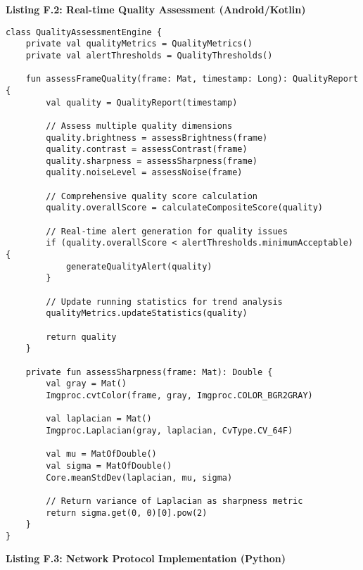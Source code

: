 \documentclass[11pt,a4paper]{article}
\begin{document}
\textbf{Listing F.2: Real-time Quality Assessment (Android/Kotlin)}

\begin{verbatim}
class QualityAssessmentEngine {
    private val qualityMetrics = QualityMetrics()
    private val alertThresholds = QualityThresholds()

    fun assessFrameQuality(frame: Mat, timestamp: Long): QualityReport {
        val quality = QualityReport(timestamp)

        // Assess multiple quality dimensions
        quality.brightness = assessBrightness(frame)
        quality.contrast = assessContrast(frame)
        quality.sharpness = assessSharpness(frame)
        quality.noiseLevel = assessNoise(frame)

        // Comprehensive quality score calculation
        quality.overallScore = calculateCompositeScore(quality)

        // Real-time alert generation for quality issues
        if (quality.overallScore < alertThresholds.minimumAcceptable) {
            generateQualityAlert(quality)
        }

        // Update running statistics for trend analysis
        qualityMetrics.updateStatistics(quality)

        return quality
    }

    private fun assessSharpness(frame: Mat): Double {
        val gray = Mat()
        Imgproc.cvtColor(frame, gray, Imgproc.COLOR_BGR2GRAY)

        val laplacian = Mat()
        Imgproc.Laplacian(gray, laplacian, CvType.CV_64F)

        val mu = MatOfDouble()
        val sigma = MatOfDouble()
        Core.meanStdDev(laplacian, mu, sigma)

        // Return variance of Laplacian as sharpness metric
        return sigma.get(0, 0)[0].pow(2)
    }
}
\end{verbatim}

\textbf{Listing F.3: Network Protocol Implementation (Python)}
\end{document}
